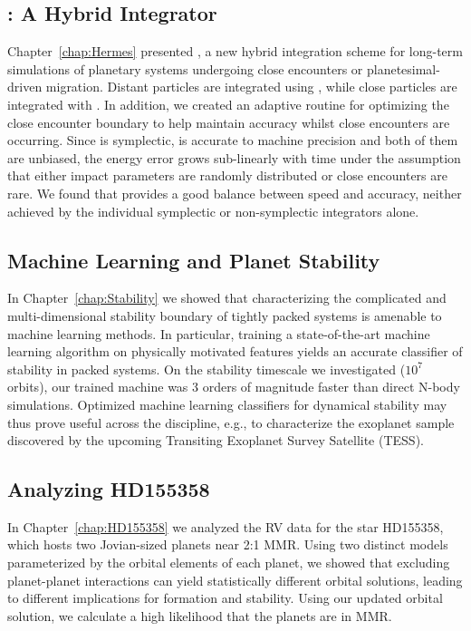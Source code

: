 \subsection{\hermes: A Hybrid Integrator}
Chapter~\ref{chap:Hermes} presented \hermes, a new hybrid integration scheme for long-term simulations of planetary systems undergoing close encounters or planetesimal-driven migration. 
Distant particles are integrated using \whfast, while close particles are integrated with \ias.
In addition, we created an adaptive routine for optimizing the close encounter boundary to help maintain accuracy whilst close encounters are occurring.
Since \whfast is symplectic, \ias is accurate to machine precision and both of them are unbiased, the energy error grows sub-linearly with time under the assumption that either impact parameters are randomly distributed or close encounters are rare.
We found that \hermes provides a good balance between speed and accuracy, neither achieved by the individual symplectic or non-symplectic integrators alone.

\subsection{Machine Learning and Planet Stability}
In Chapter~\ref{chap:Stability} we showed that characterizing the complicated and multi-dimensional stability boundary of tightly packed systems is amenable to machine learning methods. 
In particular, training a state-of-the-art machine learning algorithm on physically motivated features yields an accurate classifier of stability in packed systems. 
On the stability timescale we investigated ($10^7$ orbits), our trained machine was 3 orders of magnitude faster than direct N-body simulations. 
Optimized machine learning classifiers for dynamical stability may thus prove useful across the discipline, e.g., to characterize the exoplanet sample discovered by the upcoming Transiting Exoplanet Survey Satellite (TESS).

\subsection{Analyzing HD155358}
In Chapter~\ref{chap:HD155358} we analyzed the RV data for the star HD155358, which hosts two Jovian-sized planets near 2:1 MMR. 
Using two distinct models parameterized by the orbital elements of each planet, we showed that excluding planet-planet interactions can yield statistically different orbital solutions, leading to different implications for formation and stability. 
Using our updated orbital solution, we calculate a high likelihood that the planets are in MMR. 

